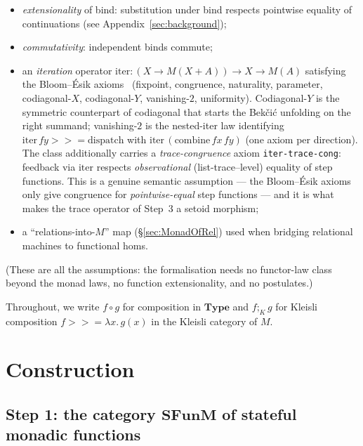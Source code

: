 \documentclass[11pt]{article}
\newcommand{\SFunM}{\mathbf{SFunM}}
\newcommand{\bind}{\mathbin{>\!\!\!>\!\!=}}
\begin{document}
\begin{itemize}
  \item \emph{extensionality} of bind: substitution under bind
        respects pointwise equality of continuations (see
        Appendix~\ref{sec:background});
  \item \emph{commutativity}: independent binds commute;
  \item an \emph{iteration} operator
        $\mathrm{iter} : (X \to M(X + A)) \to X \to M(A)$ satisfying the
        Bloom--\'Esik axioms~\cite{BloomEsik} (fixpoint, congruence,
        naturality, parameter, codiagonal-$X$, codiagonal-$Y$,
        vanishing-$2$, uniformity).  Codiagonal-$Y$ is the
        symmetric counterpart of codiagonal that starts the
        Bek\v{c}i\'c unfolding on the right summand; vanishing-$2$
        is the nested-iter law identifying $\mathrm{iter}\,fy \bind
        \mathrm{dispatch}$ with $\mathrm{iter}\,(\mathrm{combine}\,fx\,fy)$
        (one axiom per direction).  The class additionally carries a
        \emph{trace-congruence} axiom \texttt{iter-trace-cong}:
        feedback via $\mathrm{iter}$ respects \emph{observational}
        (list-trace--level) equality of step functions.  This is a
        genuine semantic assumption --- the Bloom--\'Esik axioms only
        give congruence for \emph{pointwise-equal} step functions ---
        and it is what makes the trace operator of Step~3 a setoid
        morphism;
  \item a ``relations-into-$M$'' map (\S\ref{sec:MonadOfRel}) used
        when bridging relational machines to functional homs.
\end{itemize}

\noindent
(These are all the assumptions: the formalisation needs no functor-law
class beyond the monad laws, no function extensionality, and no
postulates.)

Throughout, we write $f \circ g$ for composition in $\mathbf{Type}$ and
$f \mathbin{;}_K g$ for Kleisli composition $f \bind \lambda x. \, g(x)$
in the Kleisli category of $M$.

\section{Construction}

\subsection{Step 1: the category $\SFunM$ of stateful monadic functions}
\end{document}
